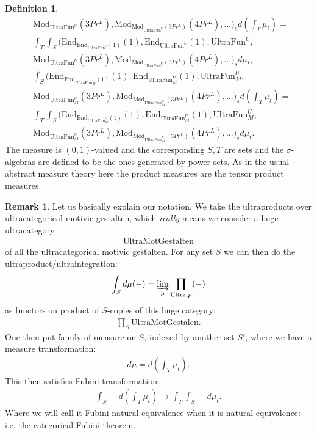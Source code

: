 \documentclass[12pt]{article}
\theoremstyle{definition}
\newtheorem{remark}{Remark}
\newtheorem{definition}{Definition}
\begin{document}
\begin{definition}
\begin{align}
&\mathrm{Mod}_{\mathrm{UltraFun}^U}(3Pr^L),\mathrm{Mod}_{\mathrm{Mod}_{\mathrm{UltraFun}^U}(3Pr^L)}(4Pr^L),...)_s d(\int_T \mu_t) =\\ 
&\int_T\int_S (\mathrm{End}_{\mathrm{End}_{\mathrm{UltraFun}^U}(1)}(1),\mathrm{End}_{\mathrm{UltraFun}^U}(1),\mathrm{UltraFun}^U,\\
&\mathrm{Mod}_{\mathrm{UltraFun}^U}(3Pr^L),\mathrm{Mod}_{\mathrm{Mod}_{\mathrm{UltraFun}^U}(3Pr^L)}(4Pr^L),...)_s d\mu_t,\\
&\int_S(\mathrm{End}_{\mathrm{End}_{\mathrm{UltraFun}_M^U}(1)}(1),\mathrm{End}_{\mathrm{UltraFun}_M^U}(1),\mathrm{UltraFun}_M^U,\\
&\mathrm{Mod}_{\mathrm{UltraFun}_M^U}(3Pr^L),\mathrm{Mod}_{\mathrm{Mod}_{\mathrm{UltraFun}_M^U}(3Pr^L)}(4Pr^L),...)_s d(\int_T \mu_t) =\\ 
&\int_T\int_S (\mathrm{End}_{\mathrm{End}_{\mathrm{UltraFun}_M^U}(1)}(1),\mathrm{End}_{\mathrm{UltraFun}_M^U}(1),\mathrm{UltraFun}_M^U,\\
&\mathrm{Mod}_{\mathrm{UltraFun}_M^U}(3Pr^L),\mathrm{Mod}_{\mathrm{Mod}_{\mathrm{UltraFun}_M^U}(3Pr^L)}(4Pr^L),...)_s d\mu_t.
\end{align}
The measure is $(0,1)$-valued and the corresponding $S,T$ are sets and the $\sigma$-algebras are defined to be the ones generated by power sets. As in the usual abstract measure theory here the product measures are the tensor product measures.
\end{definition}

\begin{remark}
Let us basically explain our notation. We take the ultraproducts over ultracategorical motivic gestalten, which \textit{really} means we consider a huge ultracategory 
\begin{align}
\mathrm{UltraMotGestalten}
\end{align}
of all the ultracategorical motivic gestalten. For any set $S$ we can then do the ultraproduct/ultraintegration:
\begin{align}
\int_S d\mu (-) = \varinjlim_{\mu}\prod_{\mathrm{Ultra},\mu} (-) 
\end{align}
as functors on product of $S$-copies of this huge category:
\begin{align}
\prod_S \mathrm{UltraMotGestalen}.
\end{align}
One then put family of measure on $S$, indexed by another set $S'$, where we have a measure transformation:
\begin{align}
d\mu = d(\int_T \mu_t).
\end{align}
This then satisfies Fubini transformation:
\begin{align}
\int_S - d(\int_T \mu_t) \rightarrow \int_T\int_S - d\mu_t.
\end{align}
Where we will call it Fubini natural equivalence when it is natural equivalence: i.e. the categorical Fubini theorem.
\end{remark}
\end{document}

